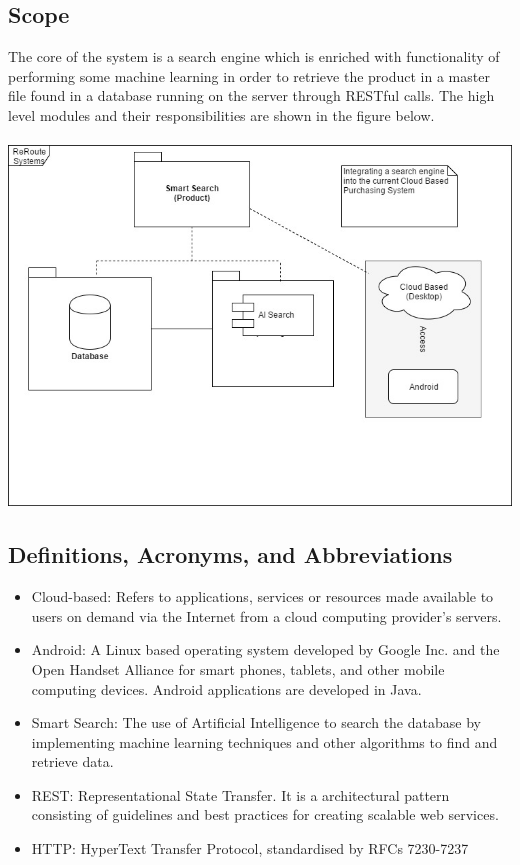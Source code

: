 \documentclass[a4paper,10pt]{article}
\begin{document}
	\subsection{Scope} 
	The core of the system is a search engine which is enriched with functionality
of performing some machine learning in order to retrieve the product in a master file found in a database running on the server through RESTful calls. The high level modules and their responsibilities are shown in the figure below. \\ \\
	\includegraphics[scale=0.62]{scope1.jpg}
	\subsection{Definitions, Acronyms, and Abbreviations} 

	\begin{itemize} 
	\item Cloud-based: Refers to applications, services or resources made available to users on demand via the Internet from a cloud computing provider's servers.
	\item Android: A Linux based operating system developed by Google Inc. and the Open Handset Alliance for smart phones, tablets, and other mobile computing devices. Android applications are developed in Java.
	\item Smart Search: The use of Artificial Intelligence to search the database by implementing machine learning techniques and other algorithms to find and retrieve data.
	\item REST: Representational State Transfer. It is a architectural pattern consisting of guidelines and best practices
for creating scalable web services.
	\item HTTP: HyperText Transfer Protocol, standardised by RFCs 7230-7237
	\end{itemize}
\end{document}

